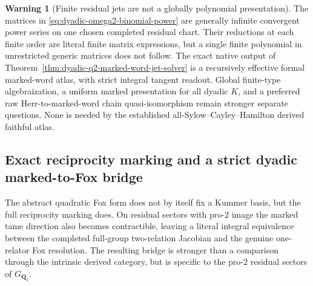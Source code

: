 \documentclass[11pt]{article}
\theoremstyle{definition}
\newtheorem{warning}[theorem]{Warning}
\begin{document}
\begin{warning}[Finite residual jets are not a globally polynomial presentation]
\label{warn:dyadic-marked-word-not-algebraic-polynomial}
The matrices in
\eqref{eq:dyadic-omega2-binomial-power}
are generally infinite convergent
power series on one chosen completed
residual chart.  Their reductions
at each finite order are literal
finite matrix expressions, but
a single finite polynomial in
unrestricted generic matrices
does not follow.
The exact native output of
Theorem~\ref{thm:dyadic-q2-marked-word-jet-solver}
is a recursively effective
formal marked-word atlas, with
strict integral tangent readout.
Global finite-type algebraization,
a uniform marked presentation for
all dyadic $K$, and a preferred
raw Herr-to-marked-word chain
quasi-isomorphism remain stronger
separate questions.  None is
needed by the established
all-Sylow--Cayley--Hamilton
derived faithful atlas.
\end{warning}


\subsection{Exact reciprocity marking and a strict dyadic marked-to-Fox bridge}
\label{subsec:dyadic-reciprocity-nielsen-bridge}

The abstract quadratic Fox form does not by itself fix a Kummer basis,
but the full reciprocity marking does.  On residual sectors with pro-$2$
image the marked tame direction also becomes contractible, leaving a
literal integral equivalence between the completed full-group
two-relation Jacobian and the genuine one-relator Fox resolution.
The resulting bridge is stronger than a comparison through the
intrinsic derived category, but is specific to the pro-$2$ residual
sectors of $G_{\mathbf Q_2}$.
\end{document}
